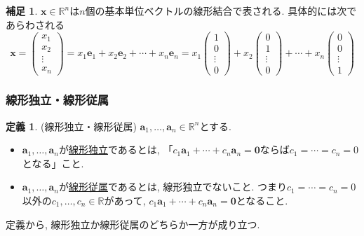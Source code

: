 \documentclass[dvipdfmx,a4paper,11pt]{article}
\newcommand{\R}{\mathbb{R}}
\theoremstyle{definition}
\newtheorem{dfn}[thm]{定義}
\newtheorem{rem}[thm]{補足}
\begin{document}
\begin{rem}
$\bm{x} \in \R^n$は$n$個の基本単位ベクトルの線形結合で表される. 具体的には次であらわされる
$$
\bm{x}
=
\begin{pmatrix}
x_1\\x_2\\\vdots\\x_n
\end{pmatrix}
=
x_1 \bm{e}_1 + x_2 \bm{e}_2 + \cdots + x_n\bm{e}_n 
=
x_1 \begin{pmatrix}
1\\0\\\vdots\\0
\end{pmatrix} + x_2 \begin{pmatrix}
0\\1\\\vdots\\0
\end{pmatrix} + \cdots + x_n\begin{pmatrix}
0\\0\\\vdots\\1
\end{pmatrix} 
$$
\end{rem}

\subsubsection{線形独立・線形従属}
\begin{tcolorbox}[
    colback = white,
    colframe = green!35!black,
    fonttitle = \bfseries,
    breakable = true]
    \begin{dfn}(線形独立・線形従属\cite[定義2.1]{M})
    \label{dfn-linear-independent}
    $\bm{a}_1, \ldots, \bm{a}_n \in \R^n$とする. 
    \begin{itemize}
	\setlength{\parskip}{0cm}
  	\setlength{\itemsep}{0pt} 
\item $\bm{a}_1, \ldots, \bm{a}_n $が\underline{線形独立}であるとは, 
「$c_1\bm{a}_1 + \cdots+ c_n\bm{a}_n = \bm{0}$ならば$c_1=\cdots =c_n =0$となる」こと.
\item $\bm{a}_1, \ldots, \bm{a}_n $が\underline{線形従属}であるとは, 
線形独立でないこと. つまり$c_1=\cdots =c_n =0$以外の$c_1, \ldots, c_n \in \R$があって, $c_1\bm{a}_1 + \cdots + c_n\bm{a}_n = \bm{0}$となること.
\end{itemize}
    \end{dfn}
 \end{tcolorbox}
 定義から, 線形独立か線形従属のどちらか一方が成り立つ. 
 
\end{document}
